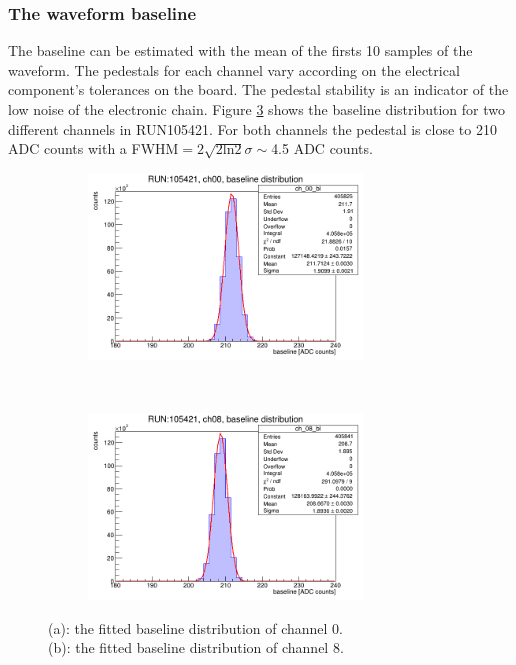 \subsubsection{The waveform baseline}\label{basel}
The baseline can be estimated with the mean of the firsts 10 samples of the waveform. 
The pedestals for each channel vary according on the electrical component's tolerances on the board.
The pedestal stability is an indicator of the low noise of the electronic chain.
Figure \ref{fig:baseline} shows the baseline distribution for two different channels in RUN105421.
For both channels the pedestal is close to 210 ADC counts with a FWHM$=2 \sqrt{2 \text{ln}2}\sigma\sim$4.5 ADC counts.
\begin{figure}[!h]
  \begin{subfigure}[b]{\textwidth}
      \centering
      \includegraphics[width=0.8\textwidth]{figures/png/baseline_ch00.png}
      \caption{}
      \label{fig:baseline1}
  \end{subfigure}
\\
  \begin{subfigure}[b]{\textwidth}
      \centering
      \includegraphics[width=0.8\textwidth]{figures/png/baseline_ch08.png}
      \caption{}
      \label{fig:baseline2}
  \end{subfigure}
     \caption{(a): the fitted baseline distribution of channel 0. 
     \\
     (b): the fitted baseline distribution of channel 8.}
     \label{fig:baseline}
\end{figure}

